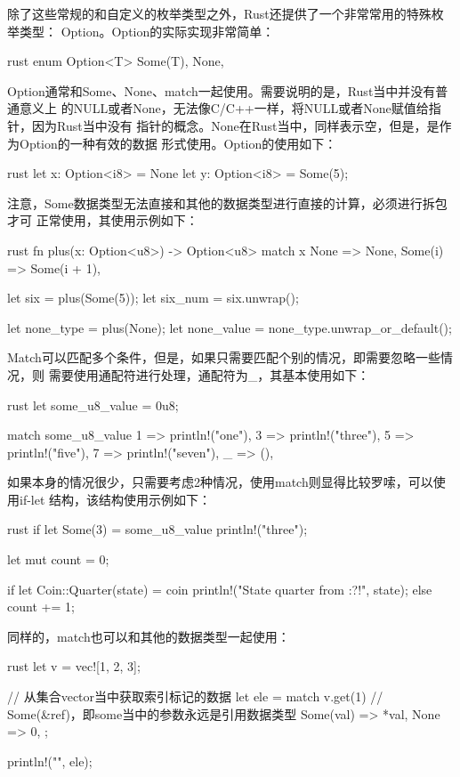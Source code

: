 除了这些常规的和自定义的枚举类型之外，Rust还提供了一个非常常用的特殊枚举类型：
Option。Option的实际实现非常简单：
\begin{code-block}{rust}
enum Option<T> {
    Some(T),
    None,
}
\end{code-block}
Option通常和Some、None、match一起使用。需要说明的是，Rust当中并没有普通意义上
的NULL或者None，无法像C/C++一样，将NULL或者None赋值给指针，因为Rust当中没有
指针的概念。None在Rust当中，同样表示空，但是，是作为Option的一种有效的数据
形式使用。Option的使用如下：
\begin{code-block}{rust}
let x: Option<i8> = None
let y: Option<i8> = Some(5);
\end{code-block}
注意，Some数据类型无法直接和其他的数据类型进行直接的计算，必须进行拆包才可
正常使用，其使用示例如下：
\begin{code-block}{rust}
fn plus(x: Option<u8>) -> Option<u8> {
    match x {
       None => None,
       Some(i) => Some(i + 1),
    }
}

let six = plus(Some(5));
let six_num = six.unwrap();

let none_type = plus(None);
let none_value = none_type.unwrap_or_default();
\end{code-block}

Match可以匹配多个条件，但是，如果只需要匹配个别的情况，即需要忽略一些情况，则
需要使用通配符进行处理，通配符为\_，其基本使用如下：
\begin{code-block}{rust}
let some_u8_value = 0u8;

match some_u8_value {
    1 => println!("one"),
    3 => println!("three"),
    5 => println!("five"),
    7 => println!("seven"),
    _ => (),
}
\end{code-block}
如果本身的情况很少，只需要考虑2种情况，使用match则显得比较罗嗦，可以使用if-let
结构，该结构使用示例如下：
\begin{code-block}{rust}
if let Some(3) = some_u8_value {
    println!("three");
}

let mut count = 0;

if let Coin::Quarter(state) = coin {
    println!("State quarter from {:?}!", state);
} else {
    count += 1;
}
\end{code-block}

同样的，match也可以和其他的数据类型一起使用：
\begin{code-block}{rust}
let v = vec![1, 2, 3];

// 从集合vector当中获取索引标记的数据
let ele = match v.get(1) {
    // Some(&ref)，即some当中的参数永远是引用数据类型
    Some(val) => *val,
    None => 0,
};

println!("{}", ele);
\end{code-block}

